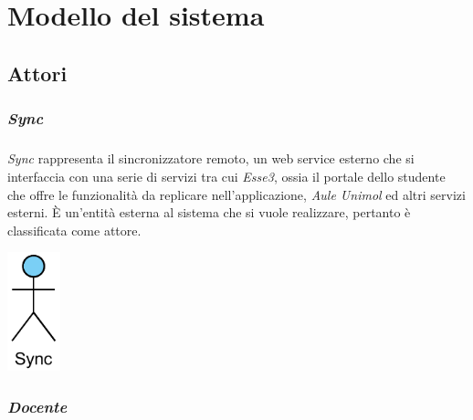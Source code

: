 
\chapter{Modello del sistema}
\label{ref:modSistema}


\section{Attori}
\label{sec:attori}
\subsection{\textit{Sync}}
\paragraph{} 
\textit{Sync} rappresenta il sincronizzatore remoto, un web service esterno che si interfaccia con una serie di servizi tra cui \textit{Esse3}, ossia il portale dello studente che offre le funzionalità da replicare nell’applicazione, \textit{Aule Unimol} ed altri servizi esterni. È un’entità esterna al sistema che si vuole realizzare, pertanto  è classificata come attore.
\begin{center}
	\includegraphics[width=0.6in]{imgs/attori/Attore-Sync.pdf}
\end{center}

\subsection{\textit{Docente}}
